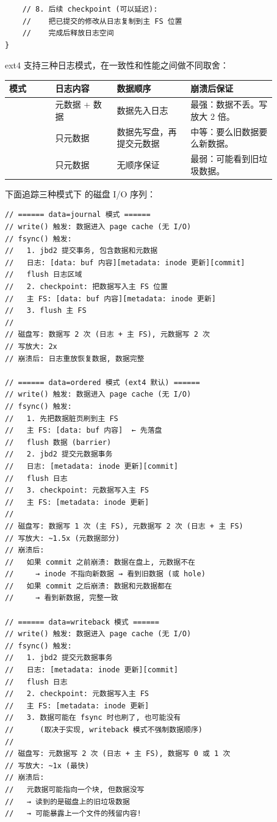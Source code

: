 \begin{filesystemlayout}
\begin{lstlisting}
    // 8. 后续 checkpoint (可以延迟):
    //    把已提交的修改从日志复制到主 FS 位置
    //    完成后释放日志空间
}
\end{lstlisting}


ext4 支持三种日志模式，在一致性和性能之间做不同取舍：

\begin{longtable}{|F{0.15\linewidth}|F{0.20\linewidth}|F{0.24\linewidth}|F{0.28\linewidth}|}
\toprule
{}
模式 & 日志内容 & 数据顺序 & 崩溃后保证 \\
\midrule
{} & 元数据 + 数据 & 数据先入日志 & 最强：数据不丢。写放大 2 倍。 \\\tablerowrule
{} & 只元数据 & 数据先写盘，再提交元数据 & 中等：要么旧数据要么新数据。 \\\tablerowrule
{} & 只元数据 & 无顺序保证 & 最弱：可能看到旧垃圾数据。 \\
\bottomrule
\end{longtable}

下面追踪三种模式下  的磁盘 I/O 序列：

\begin{lstlisting}
// ====== data=journal 模式 ======
// write() 触发: 数据进入 page cache (无 I/O)
// fsync() 触发:
//   1. jbd2 提交事务, 包含数据和元数据
//   日志: [data: buf 内容][metadata: inode 更新][commit]
//   flush 日志区域
//   2. checkpoint: 把数据写入主 FS 位置
//   主 FS: [data: buf 内容][metadata: inode 更新]
//   3. flush 主 FS
//
// 磁盘写: 数据写 2 次 (日志 + 主 FS), 元数据写 2 次
// 写放大: 2x
// 崩溃后: 日志重放恢复数据, 数据完整

// ====== data=ordered 模式 (ext4 默认) ======
// write() 触发: 数据进入 page cache (无 I/O)
// fsync() 触发:
//   1. 先把数据脏页刷到主 FS
//   主 FS: [data: buf 内容]  ← 先落盘
//   flush 数据 (barrier)
//   2. jbd2 提交元数据事务
//   日志: [metadata: inode 更新][commit]
//   flush 日志
//   3. checkpoint: 元数据写入主 FS
//   主 FS: [metadata: inode 更新]
//
// 磁盘写: 数据写 1 次 (主 FS), 元数据写 2 次 (日志 + 主 FS)
// 写放大: ~1.5x (元数据部分)
// 崩溃后:
//   如果 commit 之前崩溃: 数据在盘上, 元数据不在
//     → inode 不指向新数据 → 看到旧数据 (或 hole)
//   如果 commit 之后崩溃: 数据和元数据都在
//     → 看到新数据, 完整一致

// ====== data=writeback 模式 ======
// write() 触发: 数据进入 page cache (无 I/O)
// fsync() 触发:
//   1. jbd2 提交元数据事务
//   日志: [metadata: inode 更新][commit]
//   flush 日志
//   2. checkpoint: 元数据写入主 FS
//   主 FS: [metadata: inode 更新]
//   3. 数据可能在 fsync 时也刷了, 也可能没有
//      (取决于实现, writeback 模式不强制数据顺序)
//
// 磁盘写: 元数据写 2 次 (日志 + 主 FS), 数据写 0 或 1 次
// 写放大: ~1x (最快)
// 崩溃后:
//   元数据可能指向一个块, 但数据没写
//   → 读到的是磁盘上的旧垃圾数据
//   → 可能暴露上一个文件的残留内容!
\end{lstlisting}


\end{filesystemlayout}
